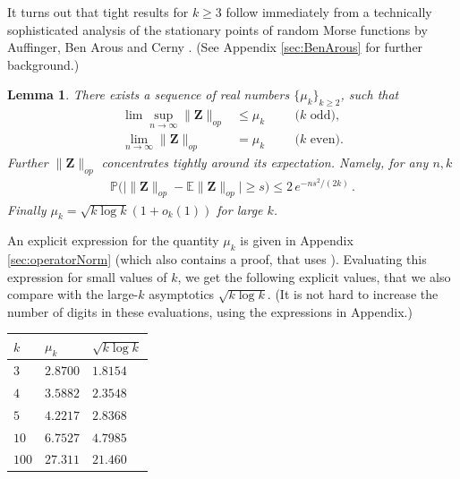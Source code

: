 \documentclass[11pt]{article}
\newtheorem{lemma}[claim]{Lemma}
\theoremstyle{definition}
\def\prob{{\mathbb P}}
\def\E{{\mathbb E}} %
\def\bZ{\mathbf{Z}}
\def\E{\mathbb{E}}
\begin{document}
It turns out that tight results for $k\ge 3$ 
follow immediately from a technically sophisticated
 analysis of  the stationary points of random
Morse functions by Auffinger, Ben Arous and Cerny  \cite{Auffinger13}.
(See Appendix \ref{sec:BenArous} for further background.)
%
\begin{lemma}\label{lem:BenArous}
There exists a sequence of real numbers $\{ \mu_k\}_{k\geq 2}$,  such that 
%
 \begin{align}
\label{eq:muKupperBound}
\lim\sup_{n \to \infty}\|\bZ\|_{op}   &\le  \mu_k \hspace{1cm}
\mbox{($k$ odd)},\\
\lim_{n \to \infty}\|\bZ\|_{op}   &=  \mu_k \hspace{1cm}
\mbox{($k$ even)}.
\end{align}
%
Further $\|\bZ\|_{op} $ concentrates tightly around its
expectation. Namely, for any $n, k$ 
%
\begin{align}
%
\prob\big(\big|\|\bZ\|_{op}  -\E\|\bZ\|_{op}  \big|\ge s\big)\le 2\,
e^{-ns^2/(2k)}\, .
%
\end{align}
%
Finally $\mu_k = \sqrt{k \log k}(1+o_k(1))$ for large $k$.
\end{lemma}
%
An explicit expression for the quantity $\mu_k$ is given in Appendix 
\ref{sec:operatorNorm} (which also contains a proof, that uses \cite{Auffinger13}).  Evaluating this expression for small values
of $k$, we get  the following explicit values, that we also compare with
the large-$k$ asymptotics $\sqrt{k\log k}$.
(It is not hard to increase the number of digits in these evaluations,
using the expressions in Appendix.)


\vspace{0.5cm}

\begin{center}
\begin{tabular}{l|l|l}
$k$ & $\mu_k$ & $\sqrt{k\log k}$\\
\hline
$3$ & $2.8700$ & $1.8154$ \\
$4$ & $3.5882$ & $2.3548$\\
$5$ & $4.2217$ & $2.8368$\\
$10$ &$6.7527$ & $4.7985$\\
$100$&$27.311$ & $21.460$
\end{tabular}
\end{center}

\vspace{0.5cm}
\end{document}
